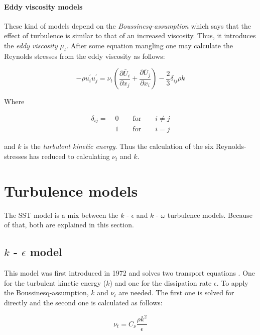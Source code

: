 \paragraph{Eddy viscosity models}
These kind of models depend on the \textit{Boussinesq-assumption} which says
that the effect of turbulence is similar to that of an increased viscosity.
Thus, it introduces the \textit{eddy viscosity} $\mu_{t}$. After some equation
mangling one may calculate the Reynolds stresses from the eddy viscosity as
follows:

\begin{equation}
    - \rho u_{i}^{\prime} u_{j}^{\prime} =
    \nu_{t} (\frac{\partial \bar U_{i}}{\partial x_{j}} +
    \frac{\partial \bar U_{j}}{\partial x_{i}}) -
    \frac{2}{3} \delta_{ij} \rho k
    \label{eq:boussinesq}
\end{equation}

\noindent Where

\begin{align*}
    \delta_{ij} = \; &0 \qquad \text{for} \qquad i \neq j \\
    &1 \qquad \text{for} \qquad i = j
\end{align*}

\noindent and $k$ is the \textit{turbulent kinetic energy}. Thus the calculation
of the six Reynolds-stresses has reduced to calculating $\nu_{t}$ and $k$.
\cite{leschziner2015statistical}




\section{Turbulence models}
The SST model is a mix between the $k$ - $\epsilon$ and $k$ - $\omega$
turbulence models. Because of that, both are explained in this section.


\subsection{$k$ - $\epsilon$ model}
This model was first introduced in 1972 and solves two transport equations
.\cite{JONES1972301} One for the turbulent kinetic energy ($k$) and one for the
dissipation rate $\epsilon$. To apply the Boussinesq-assumption, $k$ and
$\nu_t$ are needed. The first one is solved for directly and the second one is
calculated as follows:

\begin{equation}
    \nu_t = C_{\nu} \frac{\rho k^2}{\epsilon}
\end{equation}


